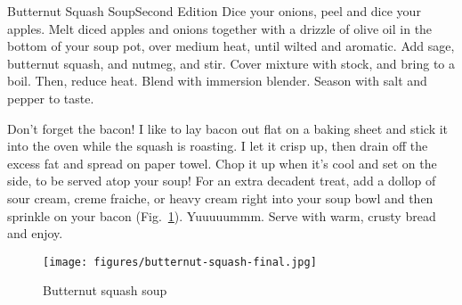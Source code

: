 \begin{entry}{Butternut Squash Soup}{Second Edition}
Dice your onions, peel and dice your apples. Melt diced apples and onions
together with a drizzle of olive oil in the bottom of your soup pot, over
medium heat, until wilted and aromatic. Add sage, butternut squash, and
nutmeg, and stir. Cover mixture with stock, and bring to a boil. Then, reduce
heat. Blend with immersion blender. Season with salt and pepper to taste.

Don't forget the bacon! I like to lay bacon out flat on a baking sheet and stick
it into the oven while the squash is roasting. I let it crisp up, then drain off
the excess fat and spread on paper towel. Chop it up when it's cool and set on
the side, to be served atop your soup! For an extra decadent treat, add a dollop
of sour cream, creme fraiche, or heavy cream right into your soup bowl and then
sprinkle on your bacon (Fig.~\ref{fig:butternut-squash-soup}). Yuuuuummm. Serve
with warm, crusty bread and enjoy.
\begin{figure}[h]
    \centering
    \texttt{[image: figures/butternut-squash-final.jpg]}
    \caption{Butternut squash soup}
    \label{fig:butternut-squash-soup}
\end{figure}
\end{entry}

